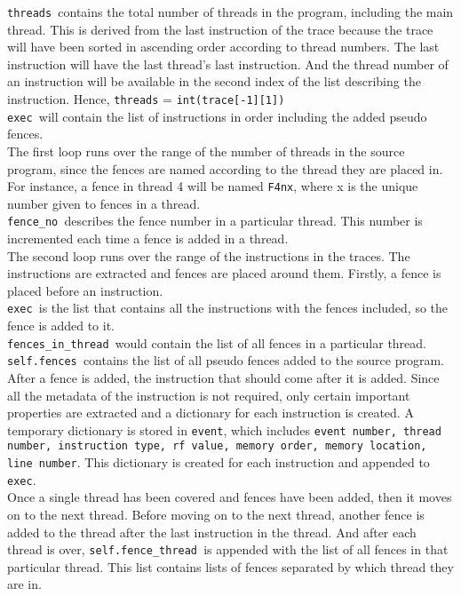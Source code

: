 \documentclass{article}
\newcommand{\var}[1]{\color{OliveGreen} \texttt{#1}\color{black}}
\newcommand{\varinfo}[1]{\scriptsize \texttt{#1} \normalsize}
\begin{document}
\var{threads }contains the total number of threads in the program, including the main thread. This is derived from the last instruction of the trace because the trace will have been sorted in ascending order according to thread numbers. The last instruction will have the last thread's last instruction. And the thread number of an instruction will be available in the second index of the list describing the instruction. Hence, \var{threads} = \varinfo{int(trace[-1][1])}\\

\var{exec }will contain the list of instructions in order including the added pseudo fences.\\

The first loop runs over the range of the number of threads in the source program, since the fences are named according to the thread they are placed in. For instance, a fence in thread 4 will be named \texttt{F4nx}, where x is the unique number given to fences in a thread. \\

\var{fence\_no }describes the fence number in a particular thread. This number is incremented each time a fence is added in a thread.\\

The second loop runs over the range of the instructions in the traces. The instructions are extracted and fences are placed around them. Firstly, a fence is placed before an instruction.\\
\var{exec }is the list that contains all the instructions with the fences included, so the fence is added to it.\\
\var{fences\_in\_thread }would contain the list of all fences in a particular thread.\\
\var{self.fences }contains the list of all pseudo fences added to the source program.\\

After a fence is added, the instruction that should come after it is added. Since all the metadata of the instruction is not required, only certain important properties are extracted and a dictionary for each instruction is created. A temporary dictionary is stored in \var{event}, which includes \texttt{event number, thread number, instruction type, rf value, memory order, memory location, line number}. This dictionary is created for each instruction and appended to \var{exec}.\\

Once a single thread has been covered and fences have been added, then it moves on to the next thread. Before moving on to the next thread, another fence is added to the thread after the last instruction in the thread. And after each thread is over, \var{self.fence\_thread }is appended with the list of all fences in that particular thread. This list contains lists of fences separated by which thread they are in.\\
\end{document}
